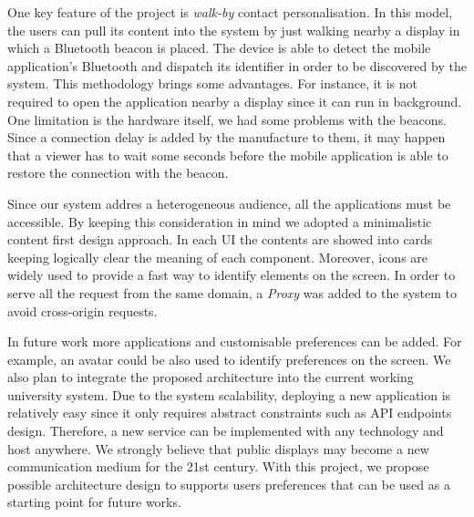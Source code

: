 \documentclass[]{usiinfbachelorproject}
\begin{document}
One key feature of the project is \emph{walk-by} contact personalisation. In this model, the users can pull its content into the system by just walking nearby a display in which a Bluetooth beacon is placed. The device is able to detect the mobile application's Bluetooth and dispatch its identifier in order to be discovered by the system. This methodology brings some advantages. For instance, it is not required to open the application nearby a display since it can run in background. 
One limitation is the hardware itself, we had some problems with the beacons. Since a connection delay is added by the manufacture to them, it may happen that a viewer has to wait some seconds before the mobile application is able to restore the connection with the beacon.

Since our system addres a heterogeneous audience, all the applications must be accessible. By keeping this consideration in mind we adopted a minimalistic content first design approach. In each UI the contents are showed into cards keeping logically clear the meaning of each component. Moreover, icons are widely used to provide a fast way to identify elements on the screen. In order to serve all the request from the same domain, a \emph{Proxy} was added to the system to avoid cross-origin requests.

In future work more applications and customisable preferences can be added. For example, an avatar could be also used to identify preferences on the screen. We also plan to integrate the proposed architecture into the current working university system. Due to the system scalability, deploying a new application is relatively easy since it only requires abstract constraints such as API endpoints design. Therefore, a new service can be implemented with any technology and host anywhere.
We strongly believe that public displays may become a new communication medium for the 21st century. With this project, we propose possible architecture design to supports users preferences that can be used as a starting point for future works.

%
%
%

\newpage


\end{document}
